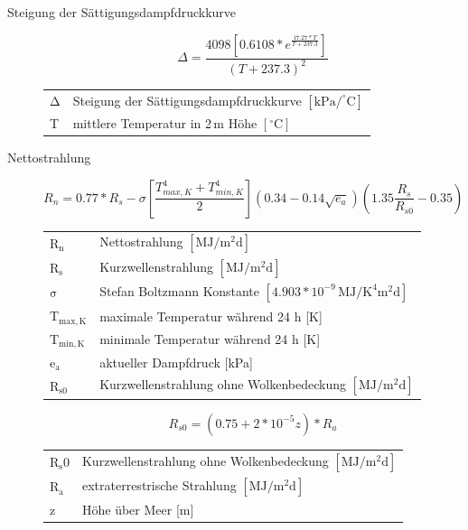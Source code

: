 \begin{description}
\item[Steigung der Sättigungsdampfdruckkurve]
\begin{equation}
\label{eq:delta}
\Delta=\frac{4098\left[0.6108*e^{\frac{17.27*T}{T+237.3}}\right]}{\left(T+237.3\right)^2}
\end{equation}
\begin{table}[H]
\centering
\begin{tabular}{ll}
$\mathrm{\Delta}$ & Steigung der Sättigungsdampfdruckkurve $\mathrm{[kPa/^{\circ}C]}$\\
T & mittlere Temperatur in 2\,m Höhe $\mathrm{[^{\circ}C]}$\\
\end{tabular}
\end{table}

\item[Nettostrahlung]
\begin{equation}
\label{eq:rn}
R_n=0.77*R_s-\sigma\left[\frac{T_{max,K}^4+T_{min,K}^4}{2}\right]\left(0.34-0.14\sqrt{e_a}\right)\left(1.35\frac{R_s}{R_{s0}}-0.35\right)
\end{equation}
\begin{table}[H]
\centering
\begin{tabular}{ll}
$\mathrm{R_n}$ & Nettostrahlung $\mathrm{[MJ/m^2d]}$ \\
$\mathrm{R_s}$ & Kurzwellenstrahlung $\mathrm{[MJ/m^2d]}$ \\
$\mathrm{\sigma}$ & Stefan Boltzmann Konstante $\mathrm{[4.903*10^{-9}\,MJ/K^4m^2d]}$\\
$\mathrm{T_{max,K}}$ & maximale Temperatur während 24 h [K]\\
$\mathrm{T_{min,K}}$ & minimale Temperatur während 24 h [K]\\
$\mathrm{e_a}$ & aktueller Dampfdruck [kPa]\\
$\mathrm{R_{s0}}$ & Kurzwellenstrahlung ohne Wolkenbedeckung $\mathrm{[MJ/m^2d]}$\\
\end{tabular}
\end{table}

\begin{equation}
\label{eq:rs0}
R_{s0}=\left(0.75+2*10^{-5}z\right)*R_a
\end{equation}
\begin{table}[H]
\centering
\begin{tabular}{ll}
$\mathrm{R_s0}$ & Kurzwellenstrahlung ohne Wolkenbedeckung $\mathrm{[MJ/m^2d]}$\\
$\mathrm{R_a}$ & extraterrestrische Strahlung $\mathrm{[MJ/m^2d]}$ \\
z & Höhe über Meer [m]\\
\end{tabular}
\end{table}



\end{description}
